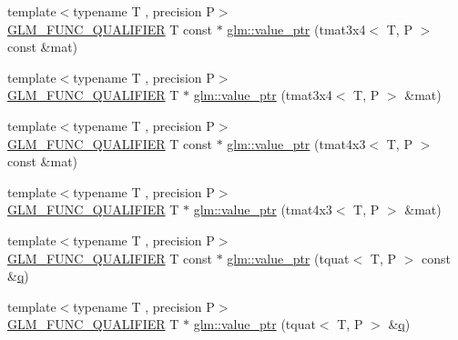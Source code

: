 \begin{DoxyCompactItemize}
\item 
{\footnotesize template$<$typename T , precision P$>$ }\\\mbox{\hyperlink{setup_8hpp_a33fdea6f91c5f834105f7415e2a64407}{G\+L\+M\+\_\+\+F\+U\+N\+C\+\_\+\+Q\+U\+A\+L\+I\+F\+I\+ER}} T const  $\ast$ \mbox{\hyperlink{group__gtc__type__ptr_gacbf08ea2313cad8a42652d4455e69709}{glm\+::value\+\_\+ptr}} (tmat3x4$<$ T, P $>$ const \&mat)
\item 
{\footnotesize template$<$typename T , precision P$>$ }\\\mbox{\hyperlink{setup_8hpp_a33fdea6f91c5f834105f7415e2a64407}{G\+L\+M\+\_\+\+F\+U\+N\+C\+\_\+\+Q\+U\+A\+L\+I\+F\+I\+ER}} T $\ast$ \mbox{\hyperlink{group__gtc__type__ptr_gafac7c10d557c3db2f061af0ffe8fc9cf}{glm\+::value\+\_\+ptr}} (tmat3x4$<$ T, P $>$ \&mat)
\item 
{\footnotesize template$<$typename T , precision P$>$ }\\\mbox{\hyperlink{setup_8hpp_a33fdea6f91c5f834105f7415e2a64407}{G\+L\+M\+\_\+\+F\+U\+N\+C\+\_\+\+Q\+U\+A\+L\+I\+F\+I\+ER}} T const  $\ast$ \mbox{\hyperlink{group__gtc__type__ptr_ga72b0a496d6c190645accac32f48f64bb}{glm\+::value\+\_\+ptr}} (tmat4x3$<$ T, P $>$ const \&mat)
\item 
{\footnotesize template$<$typename T , precision P$>$ }\\\mbox{\hyperlink{setup_8hpp_a33fdea6f91c5f834105f7415e2a64407}{G\+L\+M\+\_\+\+F\+U\+N\+C\+\_\+\+Q\+U\+A\+L\+I\+F\+I\+ER}} T $\ast$ \mbox{\hyperlink{group__gtc__type__ptr_gab9cba81cd8a7eb0afc9ac2b9f4fe05ca}{glm\+::value\+\_\+ptr}} (tmat4x3$<$ T, P $>$ \&mat)
\item 
{\footnotesize template$<$typename T , precision P$>$ }\\\mbox{\hyperlink{setup_8hpp_a33fdea6f91c5f834105f7415e2a64407}{G\+L\+M\+\_\+\+F\+U\+N\+C\+\_\+\+Q\+U\+A\+L\+I\+F\+I\+ER}} T const  $\ast$ \mbox{\hyperlink{group__gtc__type__ptr_ga26a38ff14840b35c57fa937711c5168c}{glm\+::value\+\_\+ptr}} (tquat$<$ T, P $>$ const \&\mbox{\hyperlink{glad_8h_a514729309336df22bcc8eda979d6ced4}{q}})
\item 
{\footnotesize template$<$typename T , precision P$>$ }\\\mbox{\hyperlink{setup_8hpp_a33fdea6f91c5f834105f7415e2a64407}{G\+L\+M\+\_\+\+F\+U\+N\+C\+\_\+\+Q\+U\+A\+L\+I\+F\+I\+ER}} T $\ast$ \mbox{\hyperlink{group__gtc__type__ptr_ga637414d7a9e8877e66a59f3b3d700898}{glm\+::value\+\_\+ptr}} (tquat$<$ T, P $>$ \&\mbox{\hyperlink{glad_8h_a514729309336df22bcc8eda979d6ced4}{q}})
\item 

\end{DoxyCompactItemize}
